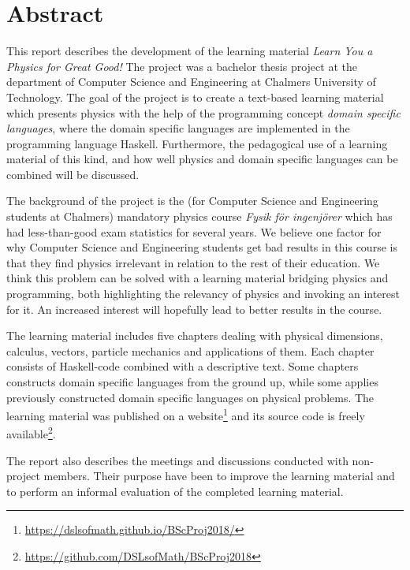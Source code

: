 \setlength{\parskip}{0.5cm}

\thispagestyle{plain}			%
\section*{Abstract}

This report describes the development of the learning material \textit{Learn You
a Physics for Great Good!} The project was a bachelor thesis project at the
department of Computer Science and Engineering at Chalmers University of
Technology. The goal of the project is to create a text-based learning material
which presents physics with the help of the programming concept \textit{domain
specific languages}, where the domain specific languages are implemented in the
programming language Haskell. Furthermore, the pedagogical use of a learning
material of this kind, and how well physics and domain specific languages can be
combined will be discussed.

The background of the project is the (for Computer Science and Engineering
students at Chalmers) mandatory physics course \textit{Fysik för ingenjörer}
which has had less-than-good exam statistics for several years. We believe one
factor for why Computer Science and Engineering students get bad results in this
course is that they find physics irrelevant in relation to the rest of their
education. We think this problem can be solved with a learning material bridging
physics and programming, both highlighting the relevancy of physics and invoking
an interest for it. An increased interest will hopefully lead to better
results in the course.

The learning material includes five chapters dealing with physical dimensions,
calculus, vectors, particle mechanics and applications of them. Each chapter
consists of Haskell-code combined with a descriptive text. Some chapters
constructs domain specific languages from the ground up, while some applies
previously constructed domain specific languages on physical problems. The
learning material was published on a
website\footnote{\url{https://dslsofmath.github.io/BScProj2018/}} and its source
code is freely
available\footnote{\url{https://github.com/DSLsofMath/BScProj2018}}.

The report also describes the meetings and discussions conducted with
non-project members. Their purpose have been to improve the learning material
and to perform an informal evaluation of the completed learning material.

